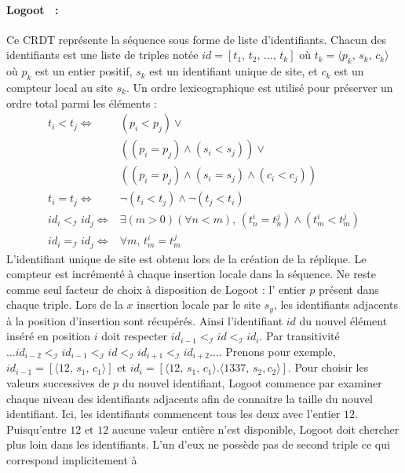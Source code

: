 \paragraph{Logoot~\cite{weiss2010collaborative, weiss2009logoot,
    weiss2010logootundo} :} Ce CRDT représente la séquence sous forme de liste
d'identifiants. Chacun des identifiants est une liste de triples notée
$id = [t_1,\,t_2,\,\ldots,\,t_k]$ où $t_k=\langle p_k,\,s_k,\,c_k \rangle$ où
$p_k$ est un entier positif, $s_k$ est un identifiant unique de site, et $c_k$
est un compteur local au site $s_k$. Un ordre lexicographique est utilisé pour
préserver un ordre total parmi les éléments :
\begin{align*}
  t_i < t_j \iff & (p_i < p_j) \vee \\
                 & ((p_i = p_j) \wedge (s_i<s_j)) \vee \\
                 & ((p_i = p_j) \wedge (s_i = s_j) \wedge (c_i < c_j)) \\
  t_i = t_j \iff & \neg (t_i < t_j) \wedge \neg (t_j < t_i) \\
  id_i <_\mathcal{I} id_j \iff & \exists (m > 0)(\forall n < m),\, (t^i_n = t^j_n) \wedge (t^i_m < t^j_m) \\
  id_i =_\mathcal{I} id_j \iff & \forall m,\, t^i_m = t^j_m
\end{align*}
L'identifiant unique de site est obtenu lors de la création de la réplique. Le
compteur est incrémenté à chaque insertion locale dans la séquence. Ne reste
comme seul facteur de choix à disposition de Logoot : l' entier $p$ présent dans
chaque triple. Lors de la $x$ insertion locale par le site $s_y$, les
identifiants adjacents à la position d'insertion sont récupérés. Ainsi
l'identifiant $id$ du nouvel élément inséré en position $i$ doit respecter
$id_{i-1}<_\mathcal{I} id <_\mathcal{I} id_i$. Par transitivité
$\ldots id_{i-2} <_\mathcal{I} id_{i-1} <_\mathcal{I} id <_\mathcal{I} id_{i+1}
<_\mathcal{I} id_{i+2} \ldots$.
Prenons pour exemple, $id_{i-1}=[\langle 12,\,s_1,\,c_1\rangle]$ et
$id_{i}=[\langle 12,\, s_1,\,c_1\rangle.\langle 1337,\, s_2, c_2\rangle]$. Pour
choisir les valeurs successives de $p$ du nouvel identifiant, Logoot commence
par examiner chaque niveau des identifiants adjacents afin de connaitre la
taille du nouvel identifiant. Ici, les identifiants commencent tous les deux
avec l'entier $12$.  Puisqu'entre $12$ et $12$ aucune valeur entière n'est
disponible, Logoot doit chercher plus loin dans les identifiants. L'un d'eux ne
possède pas de second triple ce qui correspond implicitement à
